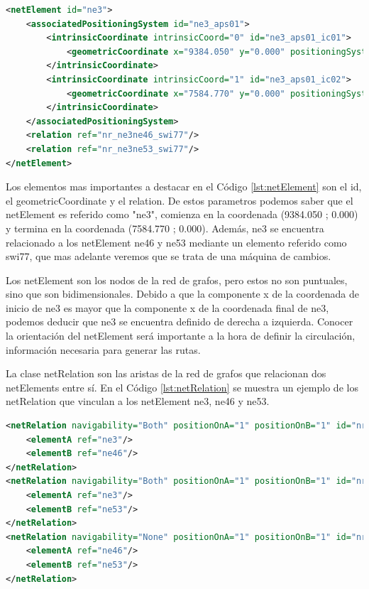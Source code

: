     \begin{lstlisting}[language = XML, caption = Clase netElement , label = {lst:netElement}]
<netElement id="ne3">
    <associatedPositioningSystem id="ne3_aps01">
        <intrinsicCoordinate intrinsicCoord="0" id="ne3_aps01_ic01">
            <geometricCoordinate x="9384.050" y="0.000" positioningSystemRef="gps01"/>
        </intrinsicCoordinate>
        <intrinsicCoordinate intrinsicCoord="1" id="ne3_aps01_ic02">
            <geometricCoordinate x="7584.770" y="0.000" positioningSystemRef="gps01"/>
        </intrinsicCoordinate>
    </associatedPositioningSystem>
    <relation ref="nr_ne3ne46_swi77"/>
    <relation ref="nr_ne3ne53_swi77"/>
</netElement>
    \end{lstlisting}
    
    Los elementos mas importantes a destacar en el Código \ref{lst:netElement} son el id, el geometricCoordinate y el relation. De estos parametros podemos saber que el netElement es referido como "ne3", comienza en la coordenada (9384.050 ; 0.000) y termina en la coordenada (7584.770 ; 0.000). Además, ne3 se encuentra relacionado a los netElement ne46 y ne53 mediante un elemento referido como swi77, que mas adelante veremos que se trata de una máquina de cambios.

    Los netElement son los nodos de la red de grafos, pero estos no son puntuales, sino que son bidimensionales. Debido a que la componente x de la coordenada de inicio de ne3 es mayor que la componente x de la coordenada final de ne3, podemos deducir que ne3 se encuentra definido de derecha a izquierda. Conocer la orientación del netElement será importante a la hora de definir la circulación, información necesaria para generar las rutas.

    La clase netRelation son las aristas de la red de grafos que relacionan dos netElements entre sí. En el Código \ref{lst:netRelation} se muestra un ejemplo de los netRelation que vinculan a los netElement ne3, ne46 y ne53.    
    
    \begin{lstlisting}[language = XML, caption = Clase netRelation , label = {lst:netRelation}]
<netRelation navigability="Both" positionOnA="1" positionOnB="1" id="nr_ne3ne46_swi77">
    <elementA ref="ne3"/>
    <elementB ref="ne46"/>
</netRelation>
<netRelation navigability="Both" positionOnA="1" positionOnB="1" id="nr_ne3ne53_swi77">
    <elementA ref="ne3"/>
    <elementB ref="ne53"/>
</netRelation>
<netRelation navigability="None" positionOnA="1" positionOnB="1" id="nr_ne46ne53_swi77">
    <elementA ref="ne46"/>
    <elementB ref="ne53"/>
</netRelation>
    \end{lstlisting}
    
